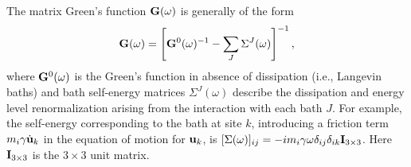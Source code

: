 The matrix Green's function $\mathbf{G}(\omega)$ is generally of the form \cite{datta}
\begin{equation}
 \mathbf{G}(\omega) = \left[\mathbf{G}^0(\omega)^{-1} - \sum_J \Sigma^J(\omega) \right]^{-1},
\end{equation}
where $\mathbf{G}^0(\omega)$ is the Green's function in absence of dissipation (i.e., Langevin baths) and bath self-energy matrices $\Sigma^J(\omega)$ describe the dissipation and energy level renormalization arising from the interaction with each bath $J$. For example, the self-energy corresponding to the bath at site $k$, introducing a friction term $m_i\gamma \dot{\mathbf{u}}_k$ in the equation of motion for $\mathbf{u}_k$, is $[\Sigma(\omega)]_{ij}=-im_i\gamma \omega \delta_{ij} \delta_{ik}\mathbf{I}_{3 \times 3}$. Here $\mathbf{I}_{3 \times 3}$ is the $3\times3$ unit matrix. 

